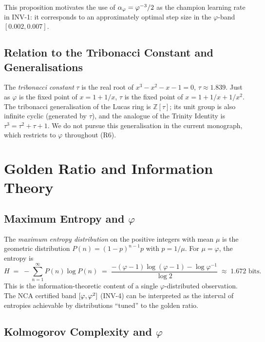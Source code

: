 This proposition motivates the use of $\alpha_\varphi = \varphi^{-3}/2$
as the champion learning rate in INV-1: it corresponds to an
approximately optimal step size in the $\varphi$-band $[0.002, 0.007]$.

\subsection{Relation to the Tribonacci Constant and Generalisations}

The \emph{tribonacci constant} $\tau$ is the real root of
$x^3 - x^2 - x - 1 = 0$, $\tau \approx 1.839$.  Just as $\varphi$
is the fixed point of $x = 1 + 1/x$, $\tau$ is the fixed point of
$x = 1 + 1/x + 1/x^2$.  The tribonacci generalisation of the
Lucas ring is $\mathbb{Z}[\tau]$; its unit group is also infinite
cyclic (generated by $\tau$), and the analogue of the Trinity Identity is
$\tau^3 = \tau^2 + \tau + 1$.  We do not pursue this generalisation
in the current monograph, which restricts to $\varphi$ throughout (R6).


\section{Golden Ratio and Information Theory}
\label{sec:monad-information}

\subsection{Maximum Entropy and $\varphi$}

The \emph{maximum entropy distribution} on the positive integers with
mean $\mu$ is the geometric distribution $P(n) = (1-p)^{n-1}p$ with
$p = 1/\mu$.  For $\mu = \varphi$, the entropy is
\[
  H \;=\; -\sum_{n=1}^{\infty} P(n)\log P(n)
     \;=\; \frac{-(\varphi-1)\log(\varphi-1) - \log\varphi^{-1}}{\log 2}
     \;\approx\; 1.672 \text{ bits}.
\]
This is the information-theoretic content of a single $\varphi$-distributed
observation.  The NCA certified band $[\varphi, \varphi^{2}]$ (INV-4)
can be interpreted as the interval of entropies achievable by
distributions ``tuned'' to the golden ratio.

\subsection{Kolmogorov Complexity and $\varphi$}


